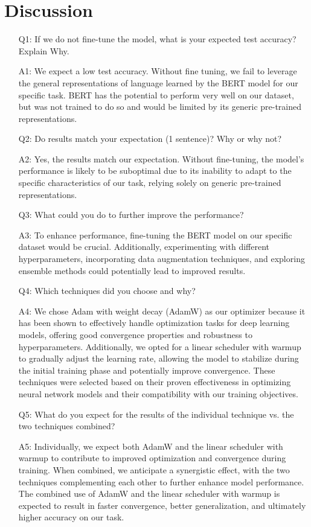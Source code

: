 \section*{Discussion}

\begin{enumerate}
  \item[Q1:] If we do not fine-tune the model, what is your expected test accuracy? Explain Why.
  \item [A1:] We expect a low test accuracy. Without fine tuning, we fail to leverage the general representations of language learned by the BERT model for our specific task. BERT has the potential to perform very well on our dataset, but was not trained to do so and would be limited by its generic pre-trained representations.
  \item [Q2:] Do results match your expectation (1 sentence)? Why or why not?
  \item [A2:] Yes, the results match our expectation. Without fine-tuning, the model's performance is likely to be suboptimal due to its inability to adapt to the specific characteristics of our task, relying solely on generic pre-trained representations.
  \item [Q3:] What could you do to further improve the performance?
  \item [A3:] To enhance performance, fine-tuning the BERT model on our specific dataset would be crucial. Additionally, experimenting with different hyperparameters, incorporating data augmentation techniques, and exploring ensemble methods could potentially lead to improved results.
  \item [Q4:] Which techniques did you choose and why?
  \item [A4:] We chose Adam with weight decay (AdamW) as our optimizer because it has been shown to effectively handle optimization tasks for deep learning models, offering good convergence properties and robustness to hyperparameters. Additionally, we opted for a linear scheduler with warmup to gradually adjust the learning rate, allowing the model to stabilize during the initial training phase and potentially improve convergence. These techniques were selected based on their proven effectiveness in optimizing neural network models and their compatibility with our training objectives.
  \item [Q5:] What do you expect for the results of the individual technique vs. the two techniques combined?
  \item [A5:] Individually, we expect both AdamW and the linear scheduler with warmup to contribute to improved optimization and convergence during training. When combined, we anticipate a synergistic effect, with the two techniques complementing each other to further enhance model performance. The combined use of AdamW and the linear scheduler with warmup is expected to result in faster convergence, better generalization, and ultimately higher accuracy on our task.

\end{enumerate}
